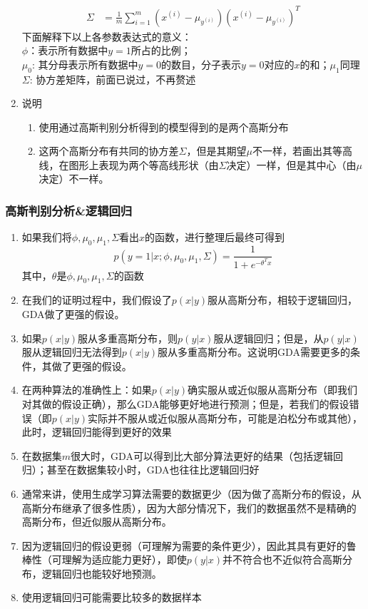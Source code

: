 \begin{enumerate}
\begin{align}
		\Sigma &= \frac{1}{m}\sum_{i=1}^{m}\left(x^{(i)}-\mu_{y^{(i)}}\right)\left(x^{(i)}-\mu_{y^{(i)}}\right)^T
	\end{align}
	下面解释下以上各参数表达式的意义： \\
	$\phi$：表示所有数据中$y=1$所占的比例； \\
	$\mu_0$: 其分母表示所有数据中$y=0$的数目，分子表示$y=0$对应的$x$的和；$\mu_1$同理 \\
	$\Sigma$: 协方差矩阵，前面已说过，不再赘述
	\item 说明
	\begin{enumerate}
		\item 使用通过高斯判别分析得到的模型得到的是两个高斯分布
		\item 这两个高斯分布有共同的协方差$\Sigma$，但是其期望$\mu$不一样，若画出其等高线，在图形上表现为两个等高线形状（由$\Sigma$决定）一样，但是其中心（由$\mu$决定）不一样。
	\end{enumerate}
\end{enumerate}

\subsubsection{高斯判别分析\&逻辑回归}
\begin{enumerate}
	\item 如果我们将$\phi, \mu_0, \mu_1, \Sigma$看出$x$的函数，进行整理后最终可得到
	\begin{equation}
		p(y=1|x; \phi, \mu_0, \mu_1, \Sigma) = \frac{1}{1+e^{-\theta^Tx}}
	\end{equation}
	其中，$\theta$是$\phi, \mu_0, \mu_1, \Sigma$的函数
	\item 在我们的证明过程中，我们假设了$p(x|y)$服从高斯分布，相较于逻辑回归，GDA做了更强的假设。
	\item 如果$p(x|y)$服从多重高斯分布，则$p(y|x)$服从逻辑回归；但是，从$p(y|x)$服从逻辑回归无法得到$p(x|y)$服从多重高斯分布。这说明GDA需要更多的条件，其做了更强的假设。
	\item 在两种算法的准确性上：如果$p(x|y)$确实服从或近似服从高斯分布（即我们对其做的假设正确），那么GDA能够更好地进行预测；但是，若我们的假设错误（即$p(x|y)$实际并不服从或近似服从高斯分布，可能是泊松分布或其他），此时，逻辑回归能得到更好的效果
	\item 在数据集$m$很大时，GDA可以得到比大部分算法更好的结果（包括逻辑回归）；甚至在数据集较小时，GDA也往往比逻辑回归好
	\item 通常来讲，使用生成学习算法需要的数据更少（因为做了高斯分布的假设，从高斯分布继承了很多性质），因为大部分情况下，我们的数据虽然不是精确的高斯分布，但近似服从高斯分布。
	\item 因为逻辑回归的假设更弱（可理解为需要的条件更少），因此其具有更好的鲁棒性（可理解为适应能力更好），即使$p(y|x)$并不符合也不近似符合高斯分布，逻辑回归也能较好地预测。
	\item 使用逻辑回归可能需要比较多的数据样本
\end{enumerate}















